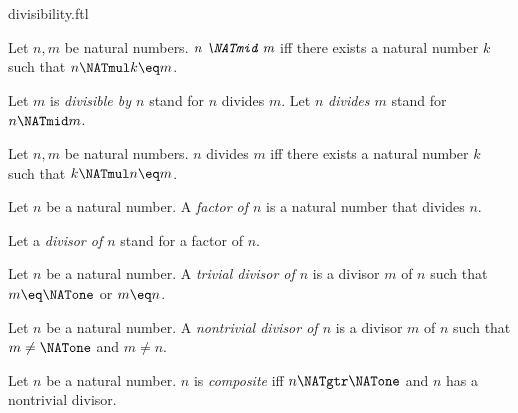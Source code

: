 \documentclass{naproche-library}
\begin{document}
\begin{smodule}[title=Divisibility]{divisibility.ftl}


\begin{definition}[forthel,id=ARITHMETIC_07_4239998993825792]
  Let $n, m$ be natural numbers.
  $\emph{n \NATmid m}$ iff there exists a natural number $k$ such that $n \NATmul k \eq m$.

  Let $m$ is \emph{divisible by $n$} stand for $n$ divides $m$.
  Let $n$ \emph{divides $m$} stand for $n \NATmid m$.
\end{definition}

\begin{lemma}[forthel,id=ARITHMETIC_07_1478855118290944]
  Let $n, m$ be natural numbers.
  $n$ divides $m$ iff there exists a natural number $k$ such that $k \NATmul n \eq m$.
\end{lemma}


\begin{definition}[forthel,id=ARITHMETIC_07_1311437490225152]
  Let $n$ be a natural number.
  A \emph{factor of $n$} is a natural number that divides $n$.

  Let a \emph{divisor of $n$} stand for a factor of $n$.
\end{definition}

\begin{definition}[forthel,id=ARITHMETIC_10_5438991513944064]
  Let $n$ be a natural number.
  A \emph{trivial divisor of $n$} is a divisor $m$ of $n$ such that $m \eq \NATone$ or $m \eq n$.
\end{definition}

\begin{definition}[forthel,id=ARITHMETIC_10_8768240253665280]
  Let $n$ be a natural number.
  A \emph{nontrivial divisor of $n$} is a divisor $m$ of $n$ such that $m \neq \NATone$ and $m \neq n$.
\end{definition}

\begin{definition}[forthel,id=ARITHMETIC_10_8020087063707648]
  Let $n$ be a natural number.
  $n$ is \emph{composite} iff $n \NATgtr \NATone$ and $n$ has a nontrivial divisor.
\end{definition}


\end{smodule}
\end{document}
